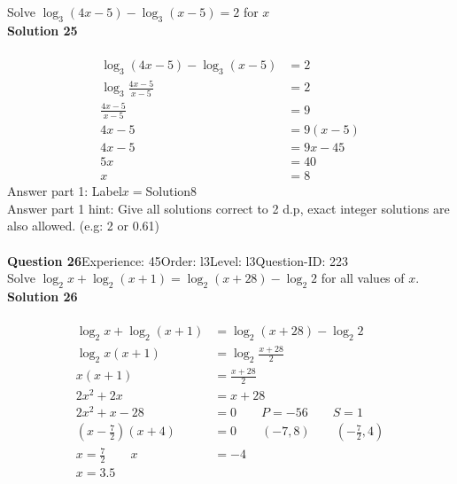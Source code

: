 \documentclass{article}
\begin{document}
Solve $\log_{3}(4x-5)-\log_{3}(x-5)=2$ for $x$\\[4pt]
\noindent\textbf{Solution 25}\\[2pt]
\\[-35pt]\begin{align*}
\log_{3}(4x-5)-\log_{3}(x-5)&=2\\[2pt]
\log_{3}\displaystyle\frac{4x-5}{x-5}&=2\\[2pt]
\displaystyle\frac{4x-5}{x-5}&=9\\[2pt]
4x-5&=9(x-5)\\[2pt]
4x-5&=9x-45\\[2pt]
5x&=40\\[2pt]
x&=8
\end{align*}
Answer part 1: \hspace{10pt}Label\hspace{10pt}$x=$\hspace{10pt}Solution\hspace{10pt}8\\
Answer part 1 hint: \hspace{15pt}Give all solutions correct to 2 d.p, exact integer solutions are also allowed. (e.g: 2 or 0.61)\\
\\[4pt]
\noindent\textbf{Question 26}\hspace{20pt}Experience: 45\hspace{20pt}Order: l3\hspace{20pt}Level: l3\hspace{20pt}Question-ID: 223\\[2pt]
Solve $\log_{2}x+\log_{2}(x+1)=\log_{2}(x+28)-\log_{2}2$ for all values of $x$.\\[4pt]
\noindent\textbf{Solution 26}\\[2pt]
\\[-35pt]\begin{align*}
\log_{2}x+\log_{2}(x+1)&=\log_{2}(x+28)-\log_{2}2\\[2pt]
\log_{2}x(x+1)&=\log_{2}\displaystyle\frac{x+28}{2}\\[2pt]
x(x+1)&=\displaystyle\frac{x+28}{2}\\[2pt]
2x^2+2x&=x+28\\[2pt]
2x^2+x-28&=0\qquad P=-56 \qquad S=1\\[2pt]
\left(x-\displaystyle\frac{7}{2}\right)(x+4)&=0\qquad (-7,8) \qquad \left(-\displaystyle\frac{7}{2},4\right)\\[2pt]
x=\displaystyle\frac{7}{2}\qquad x&=-4\\[2pt]
x=3.5\hspace{21pt}&
\end{align*}
\end{document}
